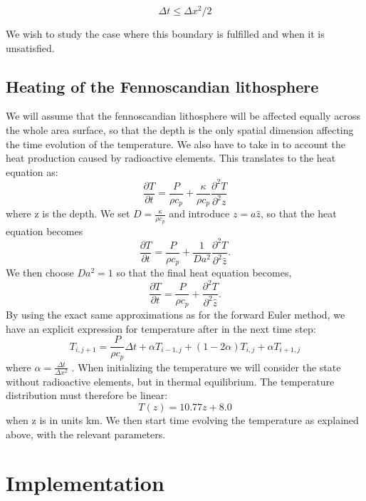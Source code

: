 \documentclass{article}
\begin{document}
\begin{multicols}{2}
\begin{equation}
\Delta t \leq \Delta x^2/2
\end{equation}

We wish to study the case where this boundary is fulfilled and when it is unsatisfied. 

\subsection{Heating of the Fennoscandian lithosphere}

We will assume that the fennoscandian lithosphere will be affected equally across the whole area surface, so that the depth is the only spatial dimension affecting the time evolution of the temperature. We also have to take in to account the heat production caused by radioactive elements. This translates to the heat equation as:
\begin{equation}
	\frac{\partial T}{\partial t}= \frac{P}{\rho c_p} + \frac{\kappa}{\rho c_p}\frac{\partial^2 T}{\partial^2 z}
\end{equation}
where z is the depth. We set $D=\frac{\kappa}{\rho c_p}$ and introduce $z=a\hat{z}$, so that the heat equation becomes
\begin{equation}
	\frac{\partial T}{\partial t}=\frac{P}{\rho c_p}+\frac{1}{D a^2}\frac{\partial^2 T}{\partial^2 \hat{z}}.
\end{equation}
We then choose $Da^2=1$ so that the final heat equation becomes,
\begin{equation}
	\frac{\partial T}{\partial t}=\frac{P}{\rho c_p}+\frac{\partial^2 T}{\partial^2 \hat{z}}.
\end{equation}
By using the exact same approximations as for the forward Euler method, we have an explicit expression for temperature after in the next time step:
\begin{equation}
	T_{i,j+1}= \frac{P}{\rho c_p}\Delta t + \alpha T_{i-1,j}+(1-2\alpha )T_{i,j} + \alpha T_{i+1, j}
\end{equation}
where $\alpha=\frac{\Delta t}{\Delta x ^2}$ . 
When initializing the temperature we will consider the state without radioactive elements, but in thermal equilibrium. The temperature distribution must therefore be linear:
\begin{equation}
	T(z) = 10.77z + 8.0
\end{equation}
when z is in units km. We then start time evolving the temperature as explained above, with the relevant parameters. 


\section{Implementation}


\end{multicols}
\end{document}
